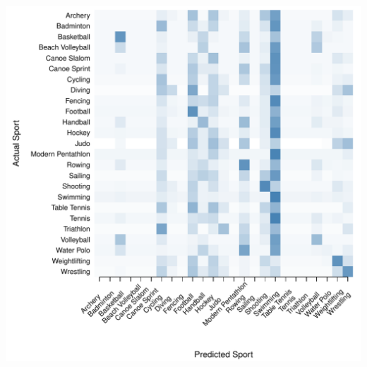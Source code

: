 \begin{center}
\begin{minipage}{0.45\textwidth}
\begin{center}
      \includegraphics[scale=0.27]{../graphics/sportEV-tst.pdf}
    \end{center}
  \end{minipage}




\end{center}
